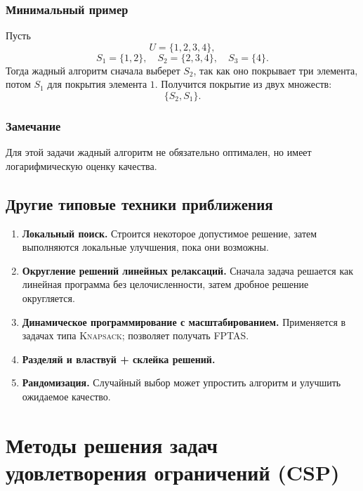 \documentclass[12pt,a4paper]{article}
\theoremstyle{definition}
\theoremstyle{plain}
\begin{document}
\subsubsection{Минимальный пример}
Пусть
\[
U=\{1,2,3,4\},
\]
\[
S_1=\{1,2\},\quad S_2=\{2,3,4\},\quad S_3=\{4\}.
\]
Тогда жадный алгоритм сначала выберет $S_2$, так как оно покрывает три элемента, потом $S_1$ для покрытия элемента $1$. Получится покрытие из двух множеств:
\[
\{S_2,S_1\}.
\]

\subsubsection{Замечание}
Для этой задачи жадный алгоритм не обязательно оптимален, но имеет логарифмическую оценку качества.

\subsection{Другие типовые техники приближения}
\begin{enumerate}
\item \textbf{Локальный поиск.}
Строится некоторое допустимое решение, затем выполняются локальные улучшения, пока они возможны.

\item \textbf{Округление решений линейных релаксаций.}
Сначала задача решается как линейная программа без целочисленности, затем дробное решение округляется.

\item \textbf{Динамическое программирование с масштабированием.}
Применяется в задачах типа \textsc{Knapsack}; позволяет получать FPTAS.

\item \textbf{Разделяй и властвуй + склейка решений.}

\item \textbf{Рандомизация.}
Случайный выбор может упростить алгоритм и улучшить ожидаемое качество.
\end{enumerate}

\section{Методы решения задач удовлетворения ограничений (CSP)}
\end{document}
